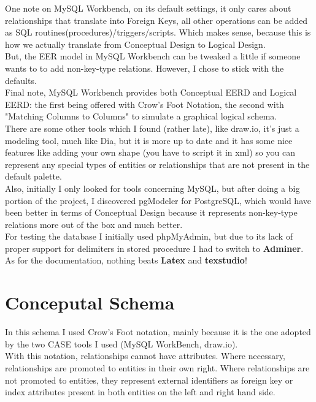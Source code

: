 \documentclass[12pt]{scrartcl}
\begin{document}
One note on MySQL Workbench, on its default settings, it only cares about relationships that translate into Foreign Keys, all other operations can be added as SQL routines(procedures)/triggers/scripts. Which makes sense, because this is how we actually translate from Conceptual Design to Logical Design.\\
But, the EER model in MySQL Workbench can be tweaked a little if someone wants to to add non-key-type relations. However, I chose to stick with the defaults.\\

Final note, MySQL Workbench provides both Conceptual EERD and Logical EERD: the first being offered with Crow's Foot Notation, the second with "Matching Columns to Columns" to simulate a graphical logical schema.\\

There are some other tools which I found (rather late), like draw.io, it's just a modeling tool, much like Dia, but it is more up to date and it has some nice features like adding your own shape (you have to script it in xml) so you can represent any special types of entities or relationships that are not present in the default palette.\\
Also, initially I only looked for tools concerning MySQL, but after doing a big portion of the project, I discovered pgModeler for PostgreSQL, which would have been better in terms of Conceptual Design because it represents non-key-type relations more out of the box and much better.\\

For testing the database I initially used phpMyAdmin, but due to its lack of proper support for delimiters in stored procedure I had to switch to \textbf{Adminer}.\\

As for the documentation, nothing beats \textbf{Latex} and \textbf{texstudio}!

\newpage
\section*{\normalsize{Conceputal Schema}}
In this schema I used Crow's Foot notation, mainly because it is the one adopted by the two CASE tools I used (MySQL WorkBench, draw.io).\\

With this notation, relationships cannot have attributes. Where necessary, relationships are promoted to entities in their own right. Where relationships are not promoted to entities, they represent external identifiers as foreign key or index attributes present in both entities on the left and right hand side.\\
\end{document}
